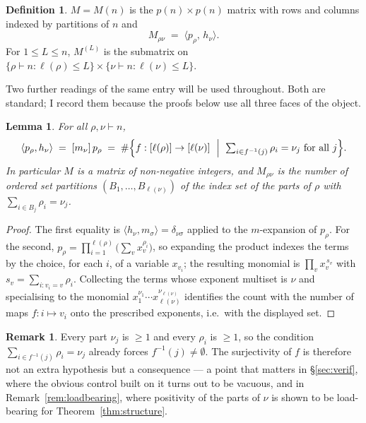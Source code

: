\documentclass[11pt]{article}
\newtheorem{lemma}[theorem]{Lemma}
\theoremstyle{definition}
\newtheorem{definition}[theorem]{Definition}
\newtheorem{remark}[theorem]{Remark}
\begin{document}
\begin{definition}\label{def:M}
$M=M(n)$ is the $p(n)\times p(n)$ matrix with rows and columns indexed by partitions of $n$ and
\[
  M_{\rho\nu}\;=\;\langle p_\rho,\,h_\nu\rangle .
\]
For $1\le L\le n$, $M^{(L)}$ is the submatrix on
$\{\rho\vdash n:\ell(\rho)\le L\}\times\{\nu\vdash n:\ell(\nu)\le L\}$.
\end{definition}

Two further readings of the same entry will be used throughout. Both are standard; I record them
because the proofs below use all three faces of the object.

\begin{lemma}\label{lem:threefaces}
For all $\rho,\nu\vdash n$,
\[
  \langle p_\rho,h_\nu\rangle
  \;=\;[m_\nu]\,p_\rho
  \;=\;\#\Bigl\{f:[\ell(\rho)]\to[\ell(\nu)]\ \Bigm|\ \textstyle\sum_{i\in f^{-1}(j)}\rho_i=\nu_j
    \ \text{for all }j\Bigr\}.
\]
In particular $M$ is a matrix of non-negative integers, and $M_{\rho\nu}$ is the number of ordered
set partitions $(B_1,\dots,B_{\ell(\nu)})$ of the index set of the parts of $\rho$ with
$\sum_{i\in B_j}\rho_i=\nu_j$.
\end{lemma}

\begin{proof}
The first equality is $\langle h_\nu,m_\sigma\rangle=\delta_{\nu\sigma}$ applied to the
$m$-expansion of $p_\rho$. For the second, $p_\rho=\prod_{i=1}^{\ell(\rho)}\bigl(\sum_v
x_v^{\rho_i}\bigr)$, so expanding the product indexes the terms by the choice, for each $i$, of a
variable $x_{v_i}$; the resulting monomial is $\prod_v x_v^{\,s_v}$ with
$s_v=\sum_{i:v_i=v}\rho_i$. Collecting the terms whose exponent multiset is $\nu$ and specialising
to the monomial $x_1^{\nu_1}\cdots x_{\ell(\nu)}^{\nu_{\ell(\nu)}}$ identifies the count with the
number of maps $f:i\mapsto v_i$ onto the prescribed exponents, i.e.\ with the displayed set.
\end{proof}

\begin{remark}\label{rem:nonempty}
Every part $\nu_j$ is $\ge1$ and every $\rho_i$ is $\ge1$, so the condition
$\sum_{i\in f^{-1}(j)}\rho_i=\nu_j$ already forces $f^{-1}(j)\ne\emptyset$. The surjectivity of $f$
is therefore not an extra hypothesis but a consequence --- a point that matters in
\S\ref{sec:verif}, where the obvious control built on it turns out to be vacuous, and in
Remark~\ref{rem:loadbearing}, where positivity of the parts of $\nu$ is shown to be load-bearing
for Theorem~\ref{thm:structure}.
\end{remark}
\end{document}
